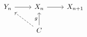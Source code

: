 \documentclass[12pt]{standalone}
\begin{document}
        $$

\begin{tikzcd}
Y_n \ar[r] & X_n \ar[r] & X_{n+1} \\
& C \ar[lu,dashed] \ar[u,"g"] &
\end{tikzcd}
        $$
        
\end{document}
